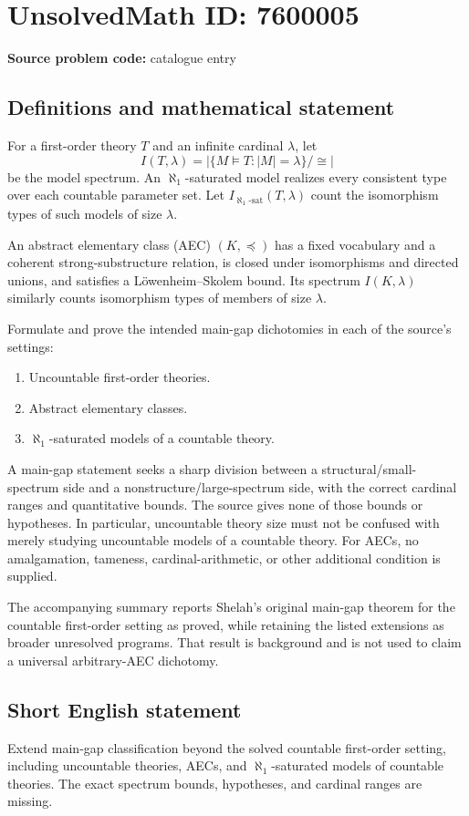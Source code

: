 \documentclass[11pt]{article}
\begin{document}
\section*{UnsolvedMath ID: 7600005}
\textbf{Source problem code:} catalogue entry
\subsection{Definitions and mathematical statement}
For a first-order theory $T$ and an infinite cardinal $\lambda$, let
\[
I(T,\lambda)=|\{M\models T:|M|=\lambda\}/\cong|
\]
be the model spectrum. An $\aleph_1$-saturated model realizes every consistent type over each countable parameter set. Let $I_{\aleph_1\text{-}\mathrm{sat}}(T,\lambda)$ count the isomorphism types of such models of size $\lambda$.

An abstract elementary class (AEC) $(K,\preccurlyeq)$ has a fixed vocabulary and a coherent strong-substructure relation, is closed under isomorphisms and directed unions, and satisfies a L\"owenheim--Skolem bound. Its spectrum $I(K,\lambda)$ similarly counts isomorphism types of members of size $\lambda$.

Formulate and prove the intended main-gap dichotomies in each of the source's settings:
\begin{enumerate}
\item Uncountable first-order theories.
\item Abstract elementary classes.
\item $\aleph_1$-saturated models of a countable theory.
\end{enumerate}
A main-gap statement seeks a sharp division between a structural/small-spectrum side and a nonstructure/large-spectrum side, with the correct cardinal ranges and quantitative bounds. The source gives none of those bounds or hypotheses. In particular, uncountable theory size must not be confused with merely studying uncountable models of a countable theory. For AECs, no amalgamation, tameness, cardinal-arithmetic, or other additional condition is supplied.

The accompanying summary reports Shelah's original main-gap theorem for the countable first-order setting as proved, while retaining the listed extensions as broader unresolved programs. That result is background and is not used to claim a universal arbitrary-AEC dichotomy.
\subsection{Short English statement}
Extend main-gap classification beyond the solved countable first-order setting, including uncountable theories, AECs, and $\aleph_1$-saturated models of countable theories. The exact spectrum bounds, hypotheses, and cardinal ranges are missing.
\end{document}
